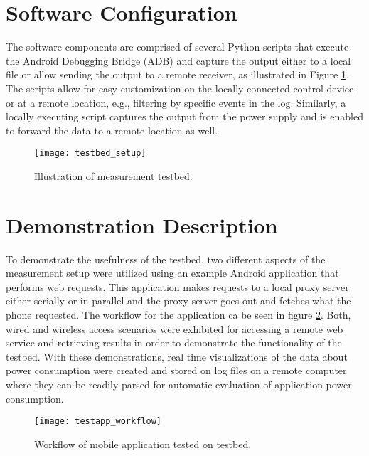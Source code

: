 \section*{Software Configuration}
The software components are comprised of several Python scripts that execute the Android Debugging Bridge (ADB) and capture the output either to a local file or allow sending the output to a remote receiver, as illustrated in  Figure \ref{fig:testbed_setup}. The scripts allow for easy customization on the locally connected control device or at a remote location, e.g., filtering by specific events in the log. Similarly, a locally executing script captures the output from the power supply and is enabled to forward the data to a remote location as well.

\begin{figure}
\centering
\texttt{[image: testbed\_setup]}
\caption{Illustration of measurement testbed.}
\label{fig:testbed_setup}
\end{figure}

\section*{Demonstration Description}
To demonstrate the usefulness of the testbed, two different aspects of the measurement setup were utilized using an example Android application that performs web requests. This application makes requests to a local proxy server either serially or in parallel and the proxy server goes out and fetches what the phone requested.  The workflow for the application ca be seen in figure \ref{fig:testapp_workflow}. Both, wired and wireless access scenarios were exhibited for accessing a remote web service and retrieving results in order to demonstrate the functionality of the testbed. With these demonstrations, real time visualizations of the data about power consumption were created and stored on log files on a remote computer where they can be readily parsed for automatic evaluation  of application power consumption.

\begin{figure}
\centering
\texttt{[image: testapp\_workflow]}
\caption{Workflow of mobile application tested on testbed.}
\label{fig:testapp_workflow}
\end{figure}
